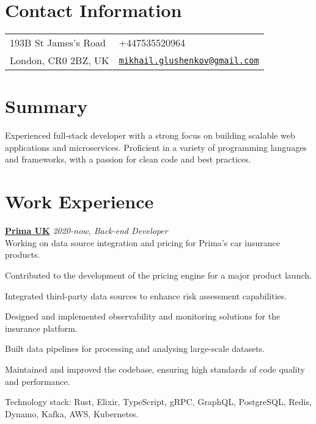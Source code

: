 \documentclass[margin,line]{res}
\begin{document}

\begin{resume}
    \section{\sc Contact Information}
    \vspace{.05in}
    \begin{tabular}{@{}p{2in}p{4in}}
        193B St James's Road &
        +447535520964                           \\
        London, CR0 2BZ, UK  &
        \href{mailto:mikhail.glushenkov@gmail.com}
        {\texttt{mikhail.glushenkov@gmail.com}} \\
    \end{tabular}

    \section{\sc Summary} Experienced full-stack developer with a strong focus
    on building scalable web applications and microservices. Proficient in a
    variety of programming languages and frameworks, with a passion for clean
    code and best practices.

    \section{\sc Work Experience}

     {\bf \href{https://helloprima.co.uk}{Prima UK}} \hfill {\it 2020-now, Back-end Developer}\\
    Working on data source integration and pricing for Prima's car insurance
    products.\\
    \begin{list}{}{\leftmargin=1.5em}
        \item Contributed to the development of the pricing engine for a major
              product launch.
        \item Integrated third-party data sources to enhance risk assessment
              capabilities.
        \item Designed and implemented observability and monitoring solutions
              for the insurance platform.
        \item Built data pipelines for processing and analysing large-scale
              datasets.
        \item Maintained and improved the codebase, ensuring high standards of
              code quality and performance.
    \end{list}
    Technology stack: Rust, Elixir, TypeScript, gRPC, GraphQL, PostgreSQL, Redis, Dynamo, Kafka, AWS, Kubernetes.


\end{resume}
\end{document}
